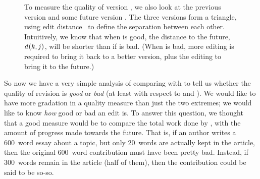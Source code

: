 \begin{figure}[t]
\centering
{}
\hspace{1ex}
\caption{To measure the quality of version , we also
	look at the previous version  and some future
	version .
	The three versions form a triangle, using
	edit distance~\cite{Levenshtein1966} to define the separation
	between each other.
	Intuitively, we know that when  is good,
	the distance to the future, $d_{}(k, j)$,
	will be shorter than if  is bad.
	(When  is bad, more editing is required to
	bring it back to a better version, plus the editing
	to bring it to the future.)
}
\label{fig-editcontr}
\end{figure}

So now we have a very simple analysis of comparing
 with  to tell us whether the
quality of revision  is \textit{good} or \textit{bad}
(at least with respect to  and ).
We would like to have more gradation in a quality measure than
just the two extremes; we would like to know \textit{how} good
or bad an edit is.
To answer this question, we thought that a good measure would
be to compare the total work done by ,
with the amount of progress made towards the future.
That is, if an author writes a 600~word essay about a topic,
but only 20~words are actually kept in the article, then the
original 600~word contribution must have been pretty bad.
Instead, if 300~words remain in the article (half of them),
then the contribution could be said to be so-so.

